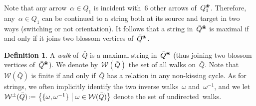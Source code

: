 \documentclass{amsart}
\theoremstyle{definition}
\newtheorem{definition}[theorem]{Definition}
\newcommand{\set}[2]{\left\{ #1 \;\middle|\; #2 \right\}} %
\newcommand{\eqdef}{\mbox{\,\raisebox{0.2ex}{\scriptsize\ensuremath{\mathrm:}}\ensuremath{=}\,}} %
\newcommand{\darkblue}{\color{darkblue}} %
\newcommand{\defn}[1]{\textsl{\darkblue #1}} %
\newcommand{\blossom}{^\text{\ding{96}}} %
\newcommand{\walks}{\mathcal{W}} %
\begin{document}
%

Note that any arrow~$\alpha \in Q_1$ is incident with~$6$ other arrows of~$Q\blossom_1$.
Therefore, any~$\alpha \in Q_1$ can be continued to a string both at its source and target in two ways (switching or not orientation).
It follows that a string in~$\bar Q\blossom$ is maximal if and only if it joins two blossom vertices of~$\bar Q\blossom$.

\begin{definition}
A \defn{walk} of~$\bar Q$ is a maximal string in~$\bar Q\blossom$ (thus joining two blossom vertices of~$\bar Q\blossom$).
We denote by~$\walks(\bar Q)$ the set of all walks on~$\bar Q$.
Note that~$\walks(\bar Q)$ is finite if and only if~$\bar Q$ has a relation in any non-kissing cycle.
As for strings, we often implicitly identify the two inverse walks~$\omega$ and~$\omega^{-1}$, and we let~$\walks^\pm(\bar Q) \eqdef \set{\{\omega, \omega^{-1}\}}{\omega \in \walks(\bar Q)}$ denote the set of undirected~walks.
\end{definition}
\end{document}
